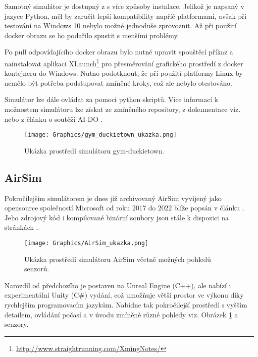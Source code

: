 \documentclass[czech, bc, kky, he, iso690numb]{fasthesis}
\begin{document}
    			Samotný simulátor je dostupný z \cite{gym_duckietown} s více způsoby instalace. Jelikož je napsaný v jazyce Python, měl by zaručit lepší kompatibility napříč platformami, avšak při testování na Windows 10 nebylo možné jednoduše zprovoznit. Až při použití docker obrazu se ho podařilo spustit s menšími problémy.
    			
    			Po pull odpovídajícího docker obrazu bylo nutné upravit spouštěcí příkaz a nainstalovat aplikaci XLaunch\footnote{\href{http://www.straightrunning.com/XmingNotes/}{http://www.straightrunning.com/XmingNotes/}} pro přesměrování grafického prostředí z docker kontejneru do Windows. Nutno podotknout, že při použití platformy Linux by nemělo být potřeba podstupovat zmíněné kroky, což ale nebylo otestováno.
    			
    			Simulátor lze dále ovládat za pomoci python skriptů. Více informací k možnostem simulátoru lze získat ze zmíněného repository, z dokumentace viz. \cite{duckietown_documentation} nebo z článku o soutěži AI-DO \cite{AI-DO}.
	    			\begin{figure}[h]
	    				\centering
	    				\texttt{[image: Graphics/gym\_duckietown\_ukazka.png]}
	    				\caption{Ukázka prostředí simulátoru gym-duckietown.}
	    			\end{figure}
    			
    		\subsection{AirSim}
    			Pokročilejším simulátorem je dnes již archivovaný AirSim vyvíjený jako opensource společností Microsoft od roku 2017 do 2022 blíže popsán v článku \cite{airsim_paper}. Jeho zdrojový kód i kompilované binární soubory jsou stále k dispozici na stránkách \cite{airsim_github}.
    			
    				\begin{figure}[h]
	    				\centering
	    				\texttt{[image: Graphics/AirSim\_ukazka.png]}
	    				\caption{Ukázka prostředí simulátoru AirSim včetně možných pohledů senzorů.}
	    				\label{pic:AirSim_ukazka}
	    			\end{figure}
    			
    			Narozdíl od předchozího je postaven na Unreal Engine (C++), ale nabízí i experimentální Unity (C\#) vydání, což umožňuje větší prostor ve výkonu díky rychlejším programovacím jazykům. Nabídne tak pokročilejší prostředí s vyšším detailem, ovládání počasí a v úvodu zmíněné různé pohledy viz. Obrázek \ref{pic:AirSim_ukazka} a senzory.
    			
\end{document}
